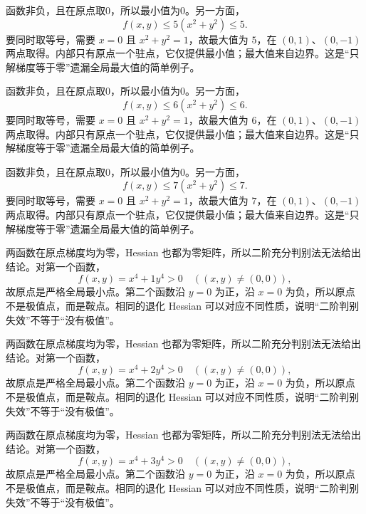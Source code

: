 \documentclass[12pt,fontset=fandol]{ctexart}
\begin{document}
\begin{solve}\label{ans:c35q16}
函数非负，且在原点取0，所以最小值为0。另一方面，
\[
f(x,y)\le 5(x^2+y^2)\le 5.
\]
要同时取等号，需要 $x=0$ 且 $x^2+y^2=1$，故最大值为 $5$，在 $(0,1)$、$(0,-1)$ 两点取得。内部只有原点一个驻点，它仅提供最小值；最大值来自边界。这是“只解梯度等于零”遗漏全局最大值的简单例子。
\end{solve}

\begin{solve}\label{ans:c35q17}
函数非负，且在原点取0，所以最小值为0。另一方面，
\[
f(x,y)\le 6(x^2+y^2)\le 6.
\]
要同时取等号，需要 $x=0$ 且 $x^2+y^2=1$，故最大值为 $6$，在 $(0,1)$、$(0,-1)$ 两点取得。内部只有原点一个驻点，它仅提供最小值；最大值来自边界。这是“只解梯度等于零”遗漏全局最大值的简单例子。
\end{solve}

\begin{solve}\label{ans:c35q18}
函数非负，且在原点取0，所以最小值为0。另一方面，
\[
f(x,y)\le 7(x^2+y^2)\le 7.
\]
要同时取等号，需要 $x=0$ 且 $x^2+y^2=1$，故最大值为 $7$，在 $(0,1)$、$(0,-1)$ 两点取得。内部只有原点一个驻点，它仅提供最小值；最大值来自边界。这是“只解梯度等于零”遗漏全局最大值的简单例子。
\end{solve}

\begin{solve}\label{ans:c35q19}
两函数在原点梯度均为零，Hessian 也都为零矩阵，所以二阶充分判别法无法给出结论。对第一个函数，
\[
f(x,y)=x^4+1y^4>0\quad((x,y)\ne(0,0)),
\]
故原点是严格全局最小点。第二个函数沿 $y=0$ 为正，沿 $x=0$ 为负，所以原点不是极值点，而是鞍点。相同的退化 Hessian 可以对应不同性质，说明“二阶判别失效”不等于“没有极值”。
\end{solve}

\begin{solve}\label{ans:c35q20}
两函数在原点梯度均为零，Hessian 也都为零矩阵，所以二阶充分判别法无法给出结论。对第一个函数，
\[
f(x,y)=x^4+2y^4>0\quad((x,y)\ne(0,0)),
\]
故原点是严格全局最小点。第二个函数沿 $y=0$ 为正，沿 $x=0$ 为负，所以原点不是极值点，而是鞍点。相同的退化 Hessian 可以对应不同性质，说明“二阶判别失效”不等于“没有极值”。
\end{solve}

\begin{solve}\label{ans:c35q21}
两函数在原点梯度均为零，Hessian 也都为零矩阵，所以二阶充分判别法无法给出结论。对第一个函数，
\[
f(x,y)=x^4+3y^4>0\quad((x,y)\ne(0,0)),
\]
故原点是严格全局最小点。第二个函数沿 $y=0$ 为正，沿 $x=0$ 为负，所以原点不是极值点，而是鞍点。相同的退化 Hessian 可以对应不同性质，说明“二阶判别失效”不等于“没有极值”。
\end{solve}
\end{document}
